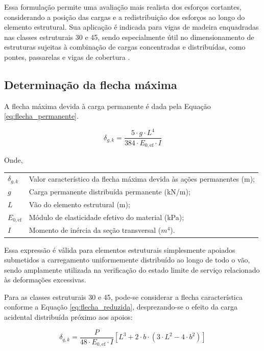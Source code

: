 Essa formulação permite uma avaliação mais realista dos esforços cortantes, considerando a posição das cargas e a redistribuição dos esforços ao longo do elemento estrutural. Sua aplicação é indicada para vigas de madeira enquadradas nas classes estruturais 30 e 45, sendo especialmente útil no dimensionamento de estruturas sujeitas à combinação de cargas concentradas e distribuídas, como pontes, passarelas e vigas de cobertura \parencite{CALIL2006}.

\subsection{Determinação da flecha máxima}\label{subsub:verificacao_flecha}

A flecha máxima devida à carga permanente é dada pela Equação \eqref{eq:flecha_permanente}.

\begin{equation}
\delta_{g,k} = \frac{5 \cdot g \cdot L^{4}}{384 \cdot E_{0,\mathrm{ef}} \cdot I}
\label{eq:flecha_permanente}
\end{equation}

Onde,

\begin{tabular}{ll}
$\delta_{g,k}$ & Valor característico da flecha máxima devida às ações permanentes (m);\\
$g$ & Carga permanente distribuída permanente (kN/m);\\
$L$ & Vão do elemento estrutural (m);\\
$E_{0,\mathrm{ef}}$ & Módulo de elasticidade efetivo do material (kPa);\\
$I$ & Momento de inércia da seção transversal ($m^4$).
\end{tabular}

Essa expressão é válida para elementos estruturais simplesmente apoiados submetidos a carregamento uniformemente distribuído ao longo de todo o vão, sendo amplamente utilizada na verificação do estado limite de serviço relacionado às deformações excessivas.

Para as classes estruturais 30 e 45, pode-se considerar a flecha característica conforme a Equação \eqref{eq:flecha_reduzida}, desprezando-se o efeito da carga acidental distribuída próximo aos apoios:

\begin{equation}
\delta_{q,k} =
\frac{P}{48 \cdot E_{0,\mathrm{ef}} \cdot I}
\left[
L^{3} + 2 \cdot b \cdot \left( 3 \cdot L^{2} - 4 \cdot b^{2} \right)
\right]
\label{eq:flecha_reduzida}
\end{equation}

